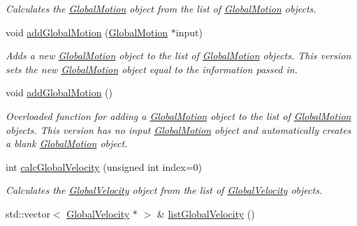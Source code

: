 \begin{DoxyCompactItemize}
\begin{DoxyCompactList}\small\item\em Calculates the \hyperlink{classosea_1_1ofreq_1_1_global_motion}{Global\-Motion} object from the list of \hyperlink{classosea_1_1ofreq_1_1_global_motion}{Global\-Motion} objects. \end{DoxyCompactList}\item 
void \hyperlink{classosea_1_1ofreq_1_1_outputs_body_a015653c3344d036543668ffe7b4a41db}{add\-Global\-Motion} (\hyperlink{classosea_1_1ofreq_1_1_global_motion}{Global\-Motion} $\ast$input)
\begin{DoxyCompactList}\small\item\em Adds a new \hyperlink{classosea_1_1ofreq_1_1_global_motion}{Global\-Motion} object to the list of \hyperlink{classosea_1_1ofreq_1_1_global_motion}{Global\-Motion} objects. This version sets the new \hyperlink{classosea_1_1ofreq_1_1_global_motion}{Global\-Motion} object equal to the information passed in. \end{DoxyCompactList}\item 
void \hyperlink{classosea_1_1ofreq_1_1_outputs_body_a889dcf6d9be6e910c110018e0a309eae}{add\-Global\-Motion} ()
\begin{DoxyCompactList}\small\item\em Overloaded function for adding a \hyperlink{classosea_1_1ofreq_1_1_global_motion}{Global\-Motion} object to the list of \hyperlink{classosea_1_1ofreq_1_1_global_motion}{Global\-Motion} objects. This version has no input \hyperlink{classosea_1_1ofreq_1_1_global_motion}{Global\-Motion} object and automatically creates a blank \hyperlink{classosea_1_1ofreq_1_1_global_motion}{Global\-Motion} object. \end{DoxyCompactList}\item 
int \hyperlink{classosea_1_1ofreq_1_1_outputs_body_a91d2e73648558390e883ba9546433577}{calc\-Global\-Velocity} (unsigned int index=0)
\begin{DoxyCompactList}\small\item\em Calculates the \hyperlink{classosea_1_1ofreq_1_1_global_velocity}{Global\-Velocity} object from the list of \hyperlink{classosea_1_1ofreq_1_1_global_velocity}{Global\-Velocity} objects. \end{DoxyCompactList}\item 
std\-::vector$<$ \hyperlink{classosea_1_1ofreq_1_1_global_velocity}{Global\-Velocity} $\ast$ $>$ \& \hyperlink{classosea_1_1ofreq_1_1_outputs_body_abfe65137648e62d545cc2d11a87db65e}{list\-Global\-Velocity} ()

\end{DoxyCompactItemize}
